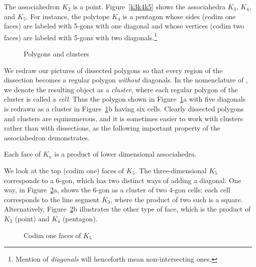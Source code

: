 \documentclass[10pt]{amsart}
\begin{document}
\begin{exmp}
The associahedron $K_2$ is a point. Figure~\ref{k3k4k5} shows the associahedra $K_3$, $K_4$, and $K_5$. For instance, the polytope $K_4$ is a pentagon whose sides (codim one faces) are labeled with 5-gons with one diagonal and whose vertices (codim two faces) are labeled with 5-gons with two diagonals.\footnote{Mention of {\em diagonals} will henceforth mean non-intersecting ones.} 
\end{exmp}

\begin{figure}[h]
\caption{Polygons and clusters}
\label{cluster}
\end{figure}

We redraw our pictures of dissected polygons so that every region of the dissection becomes a regular polygon {\em without} diagonals. In the nomenclature of \cite{r1}, we denote the resulting object as a {\em cluster}, where each regular polygon of the cluster is called a {\em cell}. Thus the polygon shown in Figure~\ref{cluster}a with five diagonals is redrawn as a cluster in Figure~\ref{cluster}b having six cells. Clearly dissected polygons and clusters are equinumerous, and it is sometimes easier to work with clusters rather than with dissections, as the following important property of the associahedron demonstrates.

\begin{prop} \textup{\cite[\S2]{jds}} \label{p:product}
Each face of $K_n$ is a product of lower dimensional associahedra.
\end{prop}

\begin{exmp}
We look at the top (codim one) faces of $K_5$. The three-dimensional $K_5$ corresponds to a 6-gon, which has two distinct ways of adding a diagonal.  One way, in Figure~\ref{k5codim1}a, shows the $6$-gon as a cluster of two $4$-gon cells; each cell corresponds to the line segment $K_3$, where the product of two such is a square. Alternatively, Figure~\ref{k5codim1}b illustrates the other type of face, which is the product of $K_2$ (point) and $K_4$ (pentagon).
\end{exmp}

\begin{figure} [h]
\caption{Codim one faces of $K_5$}
\label{k5codim1}
\end{figure}

\end{document}
